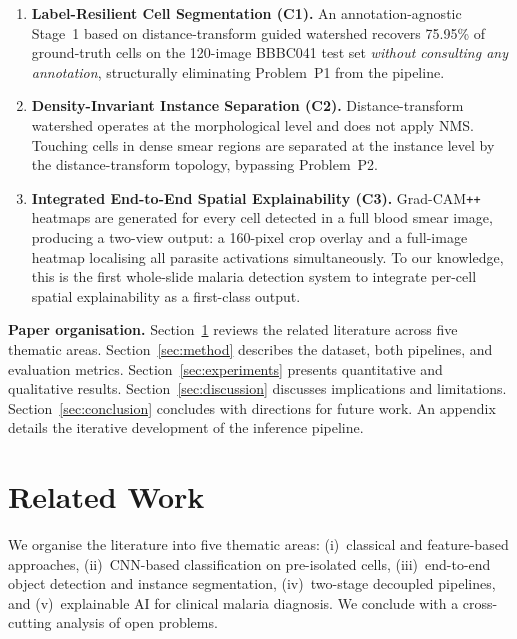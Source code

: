 \documentclass[review,12pt]{elsarticle}
\begin{document}
\begin{enumerate}[leftmargin=*, label=\textbf{C\arabic*.}]
  \item \textbf{Label-Resilient Cell Segmentation (C1).}
    An annotation-agnostic Stage~1 based on distance-transform guided
    watershed recovers 75.95\% of ground-truth cells on the 120-image
    BBBC041 test set \emph{without consulting any annotation}, structurally
    eliminating Problem~P1 from the pipeline.

  \item \textbf{Density-Invariant Instance Separation (C2).}
    Distance-transform watershed operates at the morphological level
    and does not apply NMS. Touching cells in dense smear regions are
    separated at the instance level by the distance-transform topology,
    bypassing Problem~P2.

  \item \textbf{Integrated End-to-End Spatial Explainability (C3).}
    Grad-CAM\texttt{++} heatmaps are generated for every cell detected
    in a full blood smear image, producing a two-view output: a 160-pixel
    crop overlay and a full-image heatmap localising all parasite
    activations simultaneously. To our knowledge, this is the first
    whole-slide malaria detection system to integrate per-cell spatial
    explainability as a first-class output.
\end{enumerate}

\medskip
\noindent\textbf{Paper organisation.}
Section~\ref{sec:related} reviews the related literature across five thematic
areas. Section~\ref{sec:method} describes the dataset, both pipelines, and
evaluation metrics. Section~\ref{sec:experiments} presents quantitative and
qualitative results. Section~\ref{sec:discussion} discusses implications and
limitations. Section~\ref{sec:conclusion} concludes with directions for future
work. An appendix details the iterative development of the inference pipeline.

\section{Related Work}
\label{sec:related}

We organise the literature into five thematic areas: (i)~classical and
feature-based approaches, (ii)~CNN-based classification on pre-isolated
cells, (iii)~end-to-end object detection and instance segmentation,
(iv)~two-stage decoupled pipelines, and (v)~explainable AI for clinical
malaria diagnosis. We conclude with a cross-cutting analysis of open
problems.
\end{document}
